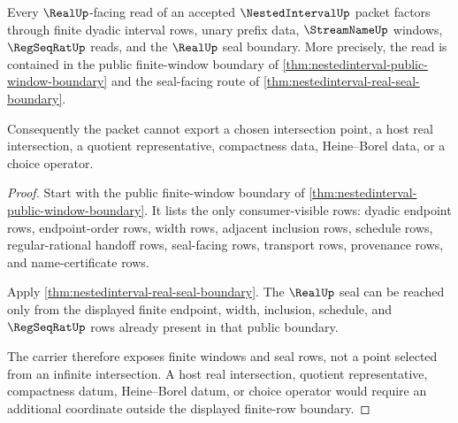 \begin{theorem}
\label{thm:nested-interval-real-seal-nonselection}
Every $\RealUp$-facing read of an accepted $\NestedIntervalUp$ packet factors through finite dyadic interval rows, unary prefix data, $\StreamNameUp$ windows, $\RegSeqRatUp$ reads, and the $\RealUp$ seal boundary. More precisely, the read is contained in the public finite-window boundary of \autoref{thm:nestedinterval-public-window-boundary} and the seal-facing route of \autoref{thm:nestedinterval-real-seal-boundary}.

Consequently the packet cannot export a chosen intersection point, a host real intersection, a quotient representative, compactness data, Heine--Borel data, or a choice operator.
\end{theorem}
\begin{proof}
Start with the public finite-window boundary of \autoref{thm:nestedinterval-public-window-boundary}. It lists the only consumer-visible rows: dyadic endpoint rows, endpoint-order rows, width rows, adjacent inclusion rows, schedule rows, regular-rational handoff rows, seal-facing rows, transport rows, provenance rows, and name-certificate rows.

Apply \autoref{thm:nestedinterval-real-seal-boundary}. The $\RealUp$ seal can be reached only from the displayed finite endpoint, width, inclusion, schedule, and $\RegSeqRatUp$ rows already present in that public boundary.

The carrier therefore exposes finite windows and seal rows, not a point selected from an infinite intersection. A host real intersection, quotient representative, compactness datum, Heine--Borel datum, or choice operator would require an additional coordinate outside the displayed finite-row boundary.
\end{proof}



